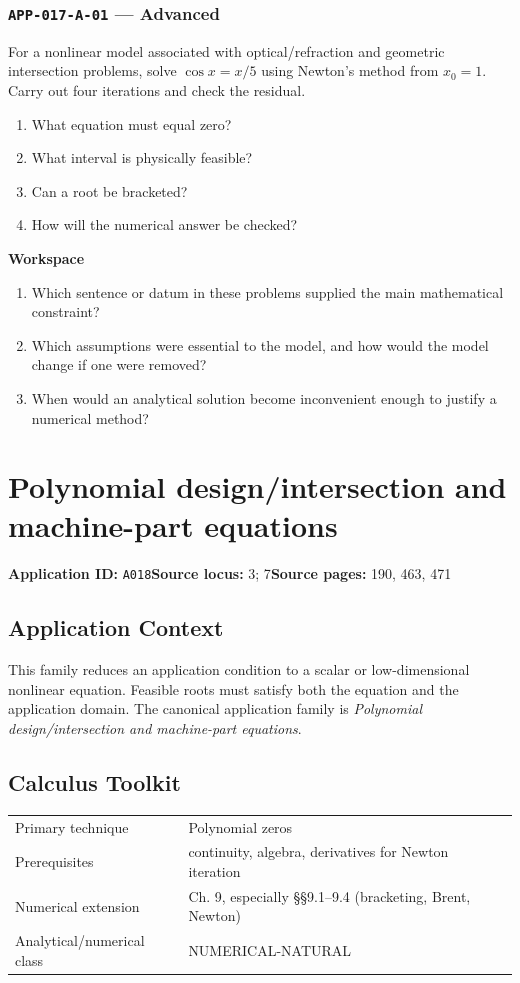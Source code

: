 \documentclass[11pt]{book}
\newcommand{\pid}[1]{\texttt{#1}}
\newcommand{\workspace}{\par\vspace{0.7in}\hrulefill\par\vspace{0.55in}\hrulefill\par}
\begin{document}
\subsection*{\pid{APP-017-A-01} — Advanced}
\begin{problembox}
For a nonlinear model associated with optical/refraction and geometric intersection problems, solve $\cos x=x/5$ using Newton's method from $x_0=1$. Carry out four iterations and check the residual.
\end{problembox}
\begin{promptbox}\begin{enumerate}
\item What equation must equal zero?
\item What interval is physically feasible?
\item Can a root be bracketed?
\item How will the numerical answer be checked?
\end{enumerate}\end{promptbox}
\textbf{Workspace}\workspace
\begin{reflectionbox}\begin{enumerate}
\item Which sentence or datum in these problems supplied the main mathematical constraint?
\item Which assumptions were essential to the model, and how would the model change if one were removed?
\item When would an analytical solution become inconvenient enough to justify a numerical method?
\end{enumerate}\end{reflectionbox}
\chapter{Polynomial design/intersection and machine-part equations}\label{app:A018}
\textbf{Application ID:} \pid{A018}\quad \textbf{Source locus:} 3; 7\quad \textbf{Source pages:} 190, 463, 471
\section*{Application Context}
This family reduces an application condition to a scalar or low-dimensional nonlinear equation. Feasible roots must satisfy both the equation and the application domain. The canonical application family is \emph{Polynomial design/intersection and machine-part equations}.
\section*{Calculus Toolkit}
\begin{tabularx}{\textwidth}{@{}lX@{}}\toprule
Primary technique & Polynomial zeros \\
Prerequisites & continuity, algebra, derivatives for Newton iteration \\
Numerical extension & Ch. 9, especially §§9.1–9.4 (bracketing, Brent, Newton) \\
Analytical/numerical class & NUMERICAL-NATURAL \\
\bottomrule\end{tabularx}
\end{document}
